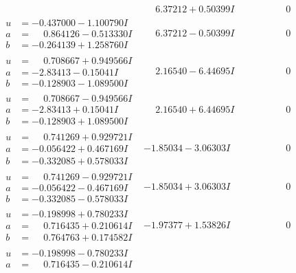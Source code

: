 \documentclass[1p]{elsarticle_modified}
\theoremstyle{definition}
\begin{document}
$$\begin{array}{c|c|c}
 & \phantom{-}6.37212 + 0.50399 I & \phantom{-0.000000 } 0 \\ \hline\begin{aligned}
u &= -0.437000 - 1.100790 I \\
a &= \phantom{-}0.864126 - 0.513330 I \\
b &= -0.264139 + 1.258760 I\end{aligned}
 & \phantom{-}6.37212 - 0.50399 I & \phantom{-0.000000 } 0 \\ \hline\begin{aligned}
u &= \phantom{-}0.708667 + 0.949566 I \\
a &= -2.83413 - 0.15041 I \\
b &= -0.128903 - 1.089500 I\end{aligned}
 & \phantom{-}2.16540 - 6.44695 I & \phantom{-0.000000 } 0 \\ \hline\begin{aligned}
u &= \phantom{-}0.708667 - 0.949566 I \\
a &= -2.83413 + 0.15041 I \\
b &= -0.128903 + 1.089500 I\end{aligned}
 & \phantom{-}2.16540 + 6.44695 I & \phantom{-0.000000 } 0 \\ \hline\begin{aligned}
u &= \phantom{-}0.741269 + 0.929721 I \\
a &= -0.056422 + 0.467169 I \\
b &= -0.332085 + 0.578033 I\end{aligned}
 & -1.85034 - 3.06303 I & \phantom{-0.000000 } 0 \\ \hline\begin{aligned}
u &= \phantom{-}0.741269 - 0.929721 I \\
a &= -0.056422 - 0.467169 I \\
b &= -0.332085 - 0.578033 I\end{aligned}
 & -1.85034 + 3.06303 I & \phantom{-0.000000 } 0 \\ \hline\begin{aligned}
u &= -0.198998 + 0.780233 I \\
a &= \phantom{-}0.716435 + 0.210614 I \\
b &= \phantom{-}0.764763 + 0.174582 I\end{aligned}
 & -1.97377 + 1.53826 I & \phantom{-0.000000 } 0 \\ \hline\begin{aligned}
u &= -0.198998 - 0.780233 I \\
a &= \phantom{-}0.716435 - 0.210614 I \\

\end{aligned}
\end{array}$$
\end{document}
